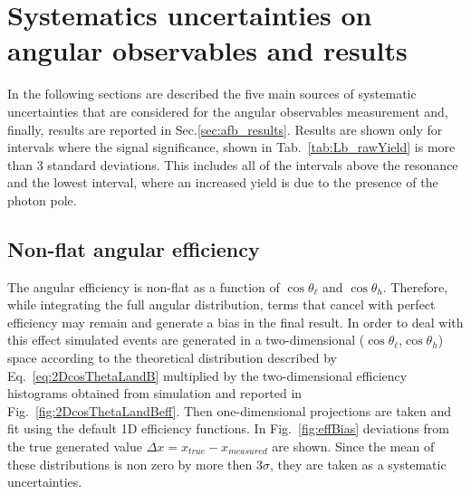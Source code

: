 \chapter{Systematics uncertainties on angular observables and results}

In the following sections are described the five main sources of systematic uncertainties
that are considered for the angular observables measurement and, finally, results are
reported in Sec.\ref{sec:afb_results}. Results are shown only for \qsq intervals
where the signal significance, shown in Tab.~\ref{tab:Lb_rawYield} is more than 3 standard
deviations. This includes all of the \qsq intervals above the \jpsi resonance and the lowest 
\qsq interval, where an increased yield is due to the presence of the photon pole.



\section{Non-flat angular efficiency}

The angular efficiency is non-flat as a function of $\cos\theta_\ell$ and $\cos \theta_h$.
Therefore, while integrating the full angular distribution, terms that cancel with perfect efficiency
may remain and generate a bias in the final result. In order to deal with this effect simulated events are
generated in a two-dimensional ($\cos\theta_\ell$,$\cos \theta_h$) space according to the
theoretical distribution described by Eq.~\ref{eq:2DcosThetaLandB} multiplied by the two-dimensional efficiency
histograms obtained from simulation and reported in Fig.~\ref{fig:2DcosThetaLandBeff}.
Then one-dimensional projections are taken and fit using the default 1D efficiency functions.
In Fig.~\ref{fig:effBias} deviations from the true generated value $\Delta x = x_{true} - x_{measured}$ are shown.
Since the mean of these distributions is non zero by more then 3$\sigma$, they are taken as a systematic uncertainties.


